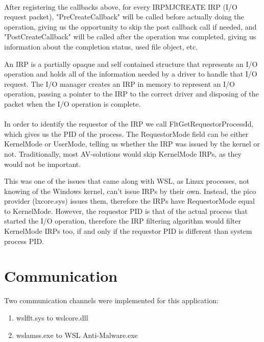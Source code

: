     \paragraph{}
    After registering the callbacks above, for every IRP\textunderscore MJ\textunderscore CREATE IRP (I/O request packet), "PreCreateCallback"
    will be called before actually doing the operation, giving us the opportunity to skip the post callback call if needed, and
    "PostCreateCallback" will be called after the operation was completed, giving us information about the completion status, used file object,
    etc.

    An IRP is a partially opaque and self contained structure that represents an I/O operation and holds all of the information needed by
    a driver to handle that I/O request. The I/O manager creates an IRP in memory to represent an I/O operation, passing a pointer to the
    IRP to the correct driver and disposing of the packet when the I/O operation is complete\cite{WindowsInternals62}.

    \paragraph{}
    In order to identify the requestor of the IRP we call FltGetRequestorProcessId, which gives us the PID of the process. The RequestorMode
    field can be either KernelMode or UserMode, telling us whether the IRP was issued by the kernel or not. Traditionally, most AV-solutions
    would skip KernelMode IRPs, as they would not be important.
    
    This was one of the issues that came along with WSL, as Linux processes, not knowing of the Windows kernel, can't issue IRPs by their own.
    Instead, the pico provider (lxcore.sys) issues them, therefore the IRPs have  RequestorMode equal to KernelMode. However, the requestor PID
    is that of the actual process that started the I/O operation, therefore the IRP filtering algorithm would filter KernelMode IRPs too, if
    and only if the requestor PID is different than system process PID.

    \pagebreak

    \section{Communication}
        
        Two communication channels were implemented for this application:
        \begin{enumerate}
            \item wslflt.sys to wslcore.dll
            \item wslamss.exe to WSL Anti-Malware.exe
        \end{enumerate}

